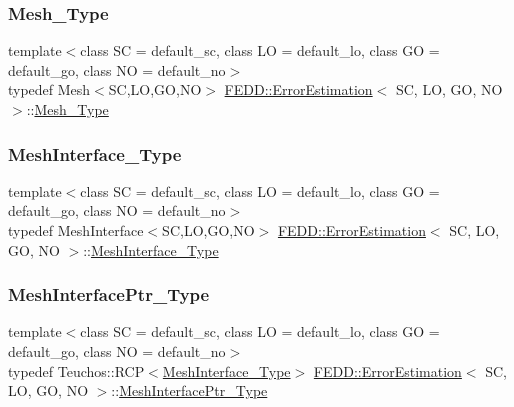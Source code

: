\subsubsection{\texorpdfstring{Mesh\+\_\+\+Type}{Mesh\_Type}}
{\footnotesize\ttfamily template$<$class SC = default\+\_\+sc, class LO = default\+\_\+lo, class GO = default\+\_\+go, class NO = default\+\_\+no$>$ \\
typedef Mesh$<$SC,LO,GO,NO$>$ \hyperlink{classFEDD_1_1ErrorEstimation}{F\+E\+D\+D\+::\+Error\+Estimation}$<$ SC, LO, GO, NO $>$\+::\hyperlink{classFEDD_1_1ErrorEstimation_a6e55e8a488e7f9db2325d530dfacada5}{Mesh\+\_\+\+Type}}

\mbox{\label{classFEDD_1_1ErrorEstimation_a11fff10f0a859ff6a2bef01b0ac73943}} 
\subsubsection{\texorpdfstring{Mesh\+Interface\+\_\+\+Type}{MeshInterface\_Type}}
{\footnotesize\ttfamily template$<$class SC = default\+\_\+sc, class LO = default\+\_\+lo, class GO = default\+\_\+go, class NO = default\+\_\+no$>$ \\
typedef Mesh\+Interface$<$SC,LO,GO,NO$>$ \hyperlink{classFEDD_1_1ErrorEstimation}{F\+E\+D\+D\+::\+Error\+Estimation}$<$ SC, LO, GO, NO $>$\+::\hyperlink{classFEDD_1_1ErrorEstimation_a11fff10f0a859ff6a2bef01b0ac73943}{Mesh\+Interface\+\_\+\+Type}}

\mbox{\label{classFEDD_1_1ErrorEstimation_aa6871369b5b28e20aac7c7178cdde50e}} 
\subsubsection{\texorpdfstring{Mesh\+Interface\+Ptr\+\_\+\+Type}{MeshInterfacePtr\_Type}}
{\footnotesize\ttfamily template$<$class SC = default\+\_\+sc, class LO = default\+\_\+lo, class GO = default\+\_\+go, class NO = default\+\_\+no$>$ \\
typedef Teuchos\+::\+R\+CP$<$\hyperlink{classFEDD_1_1ErrorEstimation_a11fff10f0a859ff6a2bef01b0ac73943}{Mesh\+Interface\+\_\+\+Type}$>$ \hyperlink{classFEDD_1_1ErrorEstimation}{F\+E\+D\+D\+::\+Error\+Estimation}$<$ SC, LO, GO, NO $>$\+::\hyperlink{classFEDD_1_1ErrorEstimation_aa6871369b5b28e20aac7c7178cdde50e}{Mesh\+Interface\+Ptr\+\_\+\+Type}}

